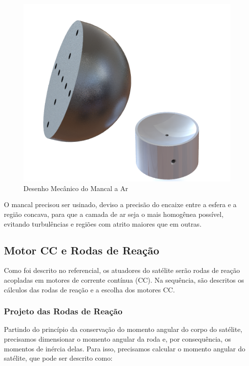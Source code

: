 \begin{figure}[H]
  \caption{Desenho Mecânico do Mancal a Ar}
  \begin{center}
      \includegraphics[scale=.45]{metodologia/img/base_desenho}
  \end{center}
  \label{fig:base_desenho}
\end{figure}

O mancal precisou ser usinado, deviso a precisão do encaixe entre a esfera e a região concava, para que a camada de ar seja o mais homogênea possível, evitando turbulências e regiões com atrito maiores que em outras. 



\subsection{Motor CC e Rodas de Reação}

Como foi descrito no referencial, os atuadores do satélite serão rodas de reação acopladas em motores de corrente contínua (CC). Na sequência, são descritos os cálculos das rodas de reação e a escolha dos motores CC. 


\subsubsection{Projeto das Rodas de Reação}

Partindo do princípio da conservação do momento angular do corpo do satélite, precisamos dimensionar o momento angular da roda e, por consequência, os momentos de inércia delas. Para isso, precisamos calcular o momento angular do satélite, que pode ser descrito como:

